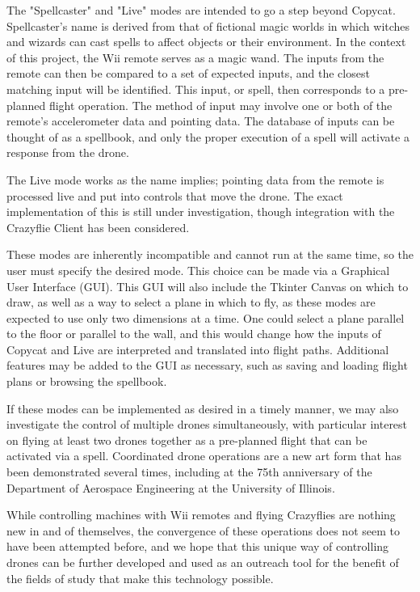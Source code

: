 \documentclass[conf]{new-aiaa}
\begin{document}
The "Spellcaster" and "Live" modes are intended to go a step beyond Copycat. Spellcaster's name is derived from that of fictional magic worlds in which witches and wizards can cast spells to affect objects or their environment. In the context of this project, the Wii remote serves as a magic wand. The inputs from the remote can then be compared to a set of expected inputs, and the closest matching input will be identified. This input, or spell, then corresponds to a pre-planned flight operation. The method of input may involve one or both of the remote's accelerometer data and pointing data. The database of inputs can be thought of as a spellbook, and only the proper execution of a spell will activate a response from the drone.

The Live mode works as the name implies; pointing data from the remote is processed live and put into controls that move the drone. The exact implementation of this is still under investigation, though integration with the Crazyflie Client has been considered. \cite{crazyflie}

These modes are inherently incompatible and cannot run at the same time, so the user must specify the desired mode. This choice can be made via a Graphical User Interface (GUI). This GUI will also include the Tkinter Canvas on which to draw, as well as a way to select a plane in which to fly, as these modes are expected to use only two dimensions at a time. One could select a plane parallel to the floor or parallel to the wall, and this would change how the inputs of Copycat and Live are interpreted and translated into flight paths. Additional features may be added to the GUI as necessary, such as saving and loading flight plans or browsing the spellbook.

If these modes can be implemented as desired in a timely manner, we may also investigate the control of multiple drones simultaneously, with particular interest on flying at least two drones together as a pre-planned flight that can be activated via a spell. Coordinated drone operations are a new art form that has been demonstrated several times, including at the 75th anniversary of the Department of Aerospace Engineering at the University of Illinois. \cite{droneshow}

While controlling machines with Wii remotes and flying Crazyflies are nothing new in and of themselves, the convergence of these operations does not seem to have been attempted before, and we hope that this unique way of controlling drones can be further developed and used as an outreach tool for the benefit of the fields of study that make this technology possible.
\end{document}
